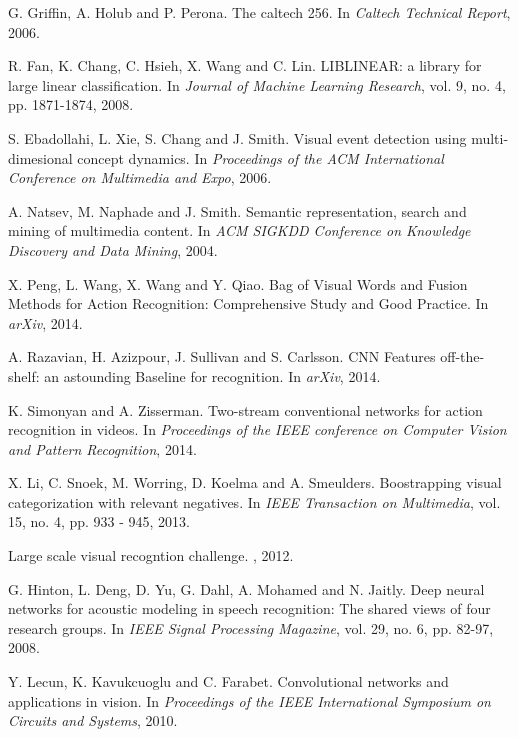 \documentclass[11pt,twocolumn,twoside]{IEEEtran}
\begin{document}
\begin{thebibliography}{1}
G. Griffin, A. Holub and P. Perona.
\newblock The caltech 256.
\newblock In {\em Caltech Technical Report}, 2006.

R. Fan, K. Chang, C. Hsieh, X. Wang and C. Lin.
\newblock LIBLINEAR: a library for large linear classification.
\newblock In {\em Journal of Machine Learning Research}, vol. 9, no. 4, pp. 1871-1874, 2008.

S. Ebadollahi, L. Xie, S. Chang and J. Smith.
\newblock Visual event detection using multi-dimesional concept dynamics.
\newblock In {\em Proceedings of the ACM International Conference on Multimedia and Expo}, 2006.

A. Natsev, M. Naphade and J. Smith.
\newblock Semantic representation, search and mining of multimedia content.
\newblock In {\em ACM SIGKDD Conference on Knowledge Discovery and Data Mining}, 2004.

X. Peng, L. Wang, X. Wang and Y. Qiao.
\newblock Bag of Visual Words and Fusion Methods for Action Recognition: Comprehensive Study and Good Practice.
\newblock In {\em arXiv}, 2014.


A. Razavian, H. Azizpour, J. Sullivan and S. Carlsson.
\newblock CNN Features off-the-shelf: an astounding Baseline for recognition.
\newblock In {\em arXiv}, 2014.

K. Simonyan and A. Zisserman.
\newblock Two-stream conventional networks for action recognition in videos.
\newblock In {\em Proceedings of the IEEE conference on Computer Vision and Pattern Recognition}, 2014.

X. Li, C. Snoek, M. Worring, D. Koelma and A. Smeulders.
\newblock Boostrapping visual categorization with relevant negatives.
\newblock In {\em IEEE Transaction on Multimedia}, vol. 15, no. 4, pp. 933 - 945, 2013.

Large scale visual recogntion challenge.
, 2012.

G. Hinton, L. Deng, D. Yu, G. Dahl, A. Mohamed and N. Jaitly.
\newblock Deep neural networks for acoustic modeling in speech recognition:
The shared views of four research groups.
\newblock In {\em IEEE Signal Processing Magazine}, vol. 29, no. 6, pp. 82-97, 2008.

Y. Lecun, K. Kavukcuoglu and C. Farabet.
\newblock Convolutional networks and applications in vision.
\newblock In {\em Proceedings of the IEEE International Symposium on Circuits and Systems}, 2010.



\end{thebibliography}
\end{document}
